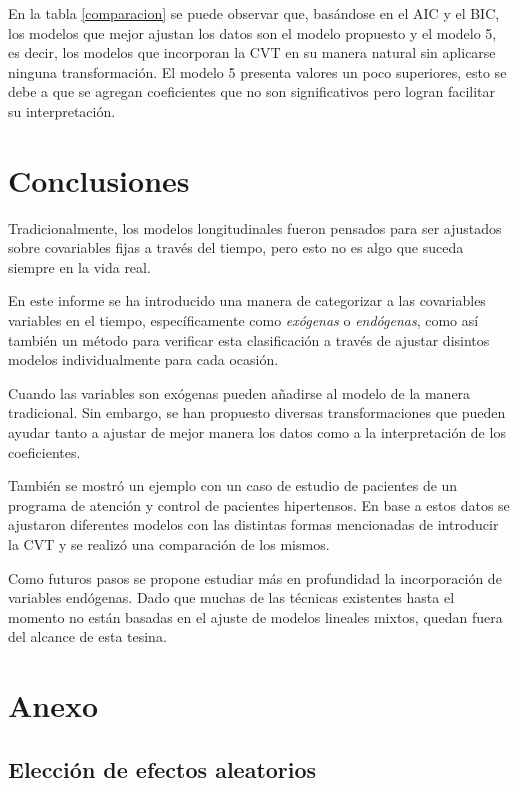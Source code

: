 \documentclass[spanish]{article}
\numberwithin{figure}{subsection}
\numberwithin{equation}{subsection}
\numberwithin{table}{subsection}
\begin{document}
En la tabla \ref{comparacion} se puede observar que, basándose en el AIC y el
BIC, los modelos que mejor ajustan los datos son el modelo propuesto y el modelo
5, es decir, los modelos que incorporan la CVT en su manera natural sin
aplicarse ninguna transformación. El modelo 5 presenta valores un poco
superiores, esto se debe a que se agregan coeficientes que no son significativos
pero logran facilitar su interpretación.

\newpage

\section{Conclusiones}

Tradicionalmente, los modelos longitudinales fueron pensados para ser ajustados
sobre covariables fijas a través del tiempo, pero esto no es algo que suceda
siempre en la vida real.

En este informe se ha introducido una manera de categorizar a las covariables
variables en el tiempo, específicamente como \textit{exógenas} o
\textit{endógenas}, como así también un método para verificar esta clasificación
a través de ajustar disintos modelos individualmente para cada ocasión.

Cuando las variables son exógenas pueden añadirse al modelo de la manera
tradicional. Sin embargo, se han propuesto diversas transformaciones que pueden
ayudar tanto a ajustar de mejor manera los datos como a la interpretación de los
coeficientes.

También se mostró un ejemplo con un caso de estudio de pacientes de un programa
de atención y control de pacientes hipertensos. En base a estos datos se
ajustaron diferentes modelos con las distintas formas mencionadas de introducir
la CVT y se realizó una comparación de los mismos.

Como futuros pasos se propone estudiar más en profundidad la incorporación
de variables endógenas. Dado que muchas de las técnicas existentes hasta el
momento no están basadas en el ajuste de modelos lineales mixtos, quedan fuera
del alcance de esta tesina.

\newpage

\section{Anexo}

\subsection{Elección de efectos aleatorios}
\label{eleccion_efectos_aleatorios}
\end{document}
